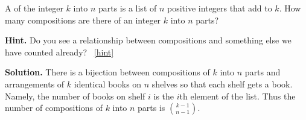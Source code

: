 \documentclass{book}
\begin{document}
\setcounter{project}{128}
\addtocounter{project}{-1}
\begin{activity}[]\label{compositionagian}
\hypertarget{p-903}{}%
A  of the integer \(k\) into \(n\) parts is a list of \(n\) positive integers that add to \(k\).  How many compositions are there of an integer \(k\) into \(n\) parts?%
\par\smallskip%
\noindent\textbf{Hint.}\hypertarget{hint-86}{}\quad%
\hypertarget{p-904}{}%
Do you see a relationship between compositions and something else we have counted already?%
~\hfill{\tiny\hyperlink{a-128}{[hint]}\hypertarget{q-128}{}}\par\smallskip%
\noindent\textbf{Solution.}\hypertarget{solution-96}{}\quad%
\hypertarget{p-905}{}%
There is a bijection between compositions of \(k\) into \(n\) parts and arrangements of \(k\) identical books on \(n\) shelves so that each shelf gets a book. Namely, the number of books on shelf \(i\) is the \(i\)th element of the list. Thus the number of compositions of \(k\) into \(n\) parts is \(\binom{k-1}{n-1}\).%
\end{activity}
\end{document}
